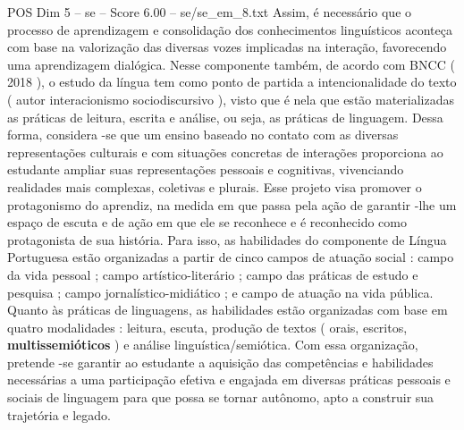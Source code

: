 \begin{textsample}{POS Dim 5 – se – Score 6.00 – se/se\_em\_8.txt}
Assim, é necessário que o processo de aprendizagem e consolidação dos conhecimentos linguísticos aconteça com base na valorização das diversas vozes implicadas na interação, favorecendo uma aprendizagem dialógica.
Nesse componente também, de acordo com BNCC ( 2018 ), o estudo da língua tem como ponto de partida a intencionalidade do texto ( autor interacionismo sociodiscursivo ), visto que é nela que estão materializadas as práticas de leitura, escrita e análise, ou seja, as práticas de linguagem.
Dessa forma, considera -se que um ensino baseado no contato com as diversas representações culturais e com situações concretas de interações proporciona ao estudante ampliar suas representações pessoais e cognitivas, vivenciando realidades mais complexas, coletivas e plurais.
Esse projeto visa promover o protagonismo do aprendiz, na medida em que passa pela ação de garantir -lhe um espaço de escuta e de ação em que ele se reconhece e é reconhecido como protagonista de sua história.
Para isso, as habilidades do componente de Língua Portuguesa estão organizadas a partir de cinco campos de atuação social : campo da vida pessoal ; campo artístico-literário ; campo das práticas de estudo e pesquisa ; campo jornalístico-midiático ; e campo de atuação na vida pública.
Quanto às práticas de linguagens, as habilidades estão organizadas com base em quatro modalidades : leitura, escuta, produção de textos ( orais, escritos, \textbf{multissemióticos} ) e análise linguística/semiótica.
Com essa organização, pretende -se garantir ao estudante a aquisição das competências e habilidades necessárias a uma participação efetiva e engajada em diversas práticas pessoais e sociais de linguagem para que possa se tornar autônomo, apto a construir sua trajetória e legado.

\end{textsample}
